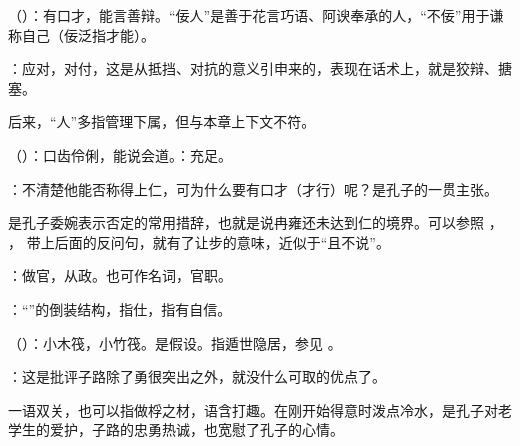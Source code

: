 {
\item {}（）：有口才，能言善辩。“佞人”是善于花言巧语、阿谀奉承的人，“不佞”用于谦称自己（佞泛指才能）。

\item {}：应对，对付，这是从抵挡、对抗的意义引申来的，表现在话术上，就是狡辩、搪塞。

后来，“人”多指管理下属，但与本章上下文不符。

\item {}（）：口齿伶俐，能说会道。：充足。

\item {}：不清楚他能否称得上仁，可为什么要有口才（才行）呢？是孔子的一贯主张。

是孔子委婉表示否定的常用措辞，也就是说冉雍还未达到仁的境界。可以参照  ， ，  带上后面的反问句，就有了让步的意味，近似于“且不说”。
}
{}


{
\item {}：做官，从政。也可作名词，官职。

\item {}：“”的倒装结构，指仕，指有自信。
}
{}


{
\item {}（）：小木筏，小竹筏。是假设。指遁世隐居，参见 。
\item {}：这是批评子路除了勇很突出之外，就没什么可取的优点了。

一语双关，也可以指做桴之材，语含打趣。在刚开始得意时泼点冷水，是孔子对老学生的爱护，子路的忠勇热诚，也宽慰了孔子的心情。
}
{}


